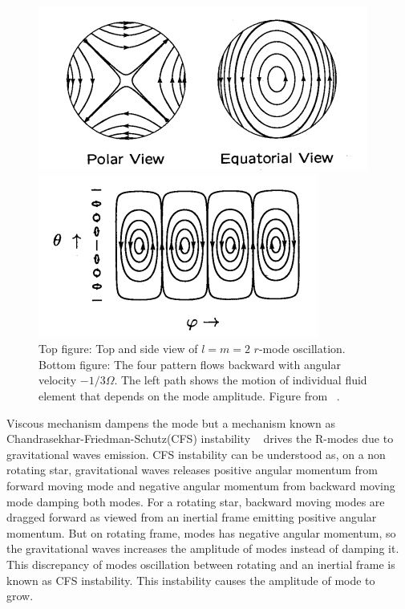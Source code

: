 \documentclass{ttuthes2007}
\begin{document}
\begin{figure}[h!]
  \centering
  \begin{minipage}[b]{0.5\textwidth}
    \includegraphics[width=\textwidth]{figure/rmodes.png}
  \end{minipage}
  \hfill
  \begin{minipage}[b]{0.5\textwidth}
    \includegraphics[width=\textwidth]{figure/rmodes1.png}
  \end{minipage}
\caption{Top figure: Top and side view of $l = m = 2$ $r$-mode oscillation.
Bottom figure: The four pattern flows backward with angular velocity $-1/3\Omega$. The
left path shows the motion of individual fluid element that depends on the mode
amplitude. Figure from ~\cite{lindblom2001neutron}.}
\end{figure}
 Viscous mechanism dampens the mode but a mechanism known as
Chandrasekhar-Friedman-Schutz(CFS) instability
~\cite{PhysRevLett.24.611}\cite{1978ApJ...222..281F} drives the R-modes due to
gravitational waves emission. CFS instability can be understood as, on a non
rotating star, gravitational waves releases positive angular momentum from
forward moving mode and negative angular momentum from backward moving mode
damping both modes. For a rotating star, backward moving modes are dragged
forward as viewed from an inertial frame emitting positive angular momentum. But
on rotating frame, modes has negative angular momentum, so the gravitational
waves increases the amplitude of modes instead of damping it. This discrepancy
of modes oscillation between rotating and an inertial frame is known as CFS
instability. This instability causes the amplitude of mode to
grow.~\cite{Owen_2000} 
\end{document}
